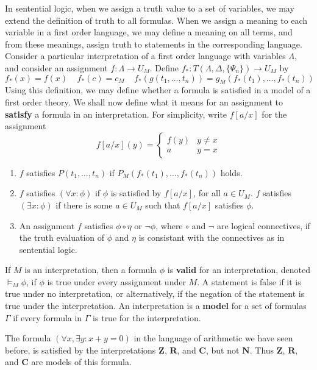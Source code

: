 In sentential logic, when we assign a truth value to a set of variables, we may extend the definition of truth to all formulas. When we assign a meaning to each variable in a first order language, we may define a meaning on all terms, and from these meanings, assign truth to statements in the corresponding language. Consider a particular interpretation of a first order language with variables $\Lambda$, and consider an assignment $f: \Lambda \to U_M$. Define $f_*: T(\Lambda, \Delta, \{ \Psi_n \}) \to U_M$ by
%
\[ f_*(x) = f(x)\ \ \ \ \ f_*(c) = c_M\ \ \ \ \ f_*(g(t_1, \dots, t_n)) = g_M(f_*(t_1), \dots, f_*(t_n)) \]
%
Using this definition, we may define whether a formula is satisfied in a model of a first order theory. We shall now define what it means for an assignment to {\bf satisfy} a formula in an interpretation. For simplicity, write $f[a/x]$ for the assignment
%
\[ f[a/x](y) = \begin{cases} f(y) & y \neq x \\ a & y = x \end{cases} \]
%
\begin{enumerate}
    \item $f$ satisfies $P(t_1, \dots, t_n)$ if $P_M(f_*(t_1), \dots, f_*(t_n))$ holds.
    \item $f$ satisfies $(\forall x: \phi)$ if $\phi$ is satisfied by $f[a/x]$, for all $a \in U_M$. $f$ satisfies $(\exists x: \phi)$ if there is some $a \in U_M$ such that $f[a/x]$ satisfies $\phi$.
    \item An assignment $f$ satisfies $\phi \circ \eta$ or $\neg \phi$, where $\circ$ and $\neg$ are logical connectives, if the truth evaluation of $\phi$ and $\eta$ is consistant with the connectives as in sentential logic.
\end{enumerate}
%
If $M$ is an interpretation, then a formula $\phi$ is {\bf valid} for an interpretation, denoted $\vDash_M \phi$, if $\phi$ is true under every assignment under $M$. A statement is false if it is true under no interpretation, or alternatively, if the negation of the statement is true under the interpretation. An interpretation is a {\bf model} for a set of formulas $\Gamma$ if every formula in $\Gamma$ is true for the interpretation.

\begin{example}
    The formula $(\forall x, \exists y: x + y = 0)$ in the language of arithmetic we have seen before, is satisfied by the interpretations $\mathbf{Z}$, $\mathbf{R}$, and $\mathbf{C}$, but not $\mathbf{N}$. Thus $\mathbf{Z}$, $\mathbf{R}$, and $\mathbf{C}$ are models of this formula.
\end{example}

